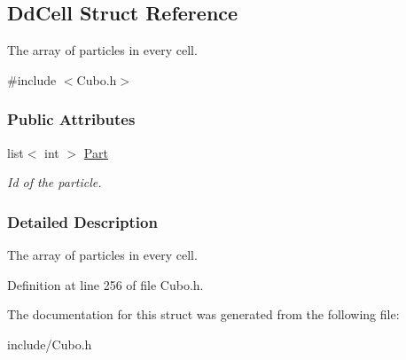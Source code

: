 \hypertarget{structDdCell}{\subsection{\-Dd\-Cell \-Struct \-Reference}
\label{structDdCell}
}


\-The array of particles in every cell.  




{\ttfamily \#include $<$\-Cubo.\-h$>$}

\subsubsection*{\-Public \-Attributes}
\begin{DoxyCompactItemize}
\item 
\hypertarget{structDdCell_a42047980ffca3c08f6cce82c43c71373}{list$<$ int $>$ \hyperlink{structDdCell_a42047980ffca3c08f6cce82c43c71373}{\-Part}}\label{structDdCell_a42047980ffca3c08f6cce82c43c71373}

\begin{DoxyCompactList}\small\item\em \-Id of the particle. \end{DoxyCompactList}\end{DoxyCompactItemize}


\subsubsection{\-Detailed \-Description}
\-The array of particles in every cell. 

\-Definition at line 256 of file \-Cubo.\-h.



\-The documentation for this struct was generated from the following file\-:\begin{DoxyCompactItemize}
\item 
include/\-Cubo.\-h\end{DoxyCompactItemize}
